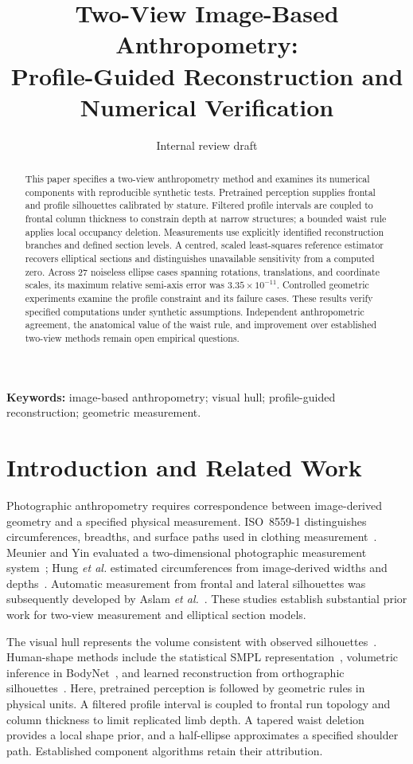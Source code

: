 \documentclass[11pt,a4paper]{article}
\title{Two-View Image-Based Anthropometry:\\
Profile-Guided Reconstruction and Numerical Verification}
\author{Internal review draft}
\date{}
\begin{document}
\maketitle

\begin{abstract}
This paper specifies a two-view anthropometry method and examines its numerical components with reproducible synthetic tests. Pretrained perception supplies frontal and profile silhouettes calibrated by stature. Filtered profile intervals are coupled to frontal column thickness to constrain depth at narrow structures; a bounded waist rule applies local occupancy deletion. Measurements use explicitly identified reconstruction branches and defined section levels. A centred, scaled least-squares reference estimator recovers elliptical sections and distinguishes unavailable sensitivity from a computed zero. Across 27 noiseless ellipse cases spanning rotations, translations, and coordinate scales, its maximum relative semi-axis error was $3.35\times10^{-11}$. Controlled geometric experiments examine the profile constraint and its failure cases. These results verify specified computations under synthetic assumptions. Independent anthropometric agreement, the anatomical value of the waist rule, and improvement over established two-view methods remain open empirical questions.
\end{abstract}
\noindent\textbf{Keywords:} image-based anthropometry; visual hull; profile-guided reconstruction; geometric measurement.

\section{Introduction and Related Work}
Photographic anthropometry requires correspondence between image-derived geometry and a specified physical measurement. ISO~8559-1 distinguishes circumferences, breadths, and surface paths used in clothing measurement~\cite{iso8559}. Meunier and Yin evaluated a two-dimensional photographic measurement system~\cite{meunier2000}; Hung \emph{et al.} estimated circumferences from image-derived widths and depths~\cite{hung2004}. Automatic measurement from frontal and lateral silhouettes was subsequently developed by Aslam \emph{et al.}~\cite{aslam2017}. These studies establish substantial prior work for two-view measurement and elliptical section models.

The visual hull represents the volume consistent with observed silhouettes~\cite{laurentini1994visual}. Human-shape methods include the statistical SMPL representation~\cite{loper2015smpl}, volumetric inference in BodyNet~\cite{varol2018bodynet}, and learned reconstruction from orthographic silhouettes~\cite{ji2019}. Here, pretrained perception is followed by geometric rules in physical units. A filtered profile interval is coupled to frontal run topology and column thickness to limit replicated limb depth. A tapered waist deletion provides a local shape prior, and a half-ellipse approximates a specified shoulder path. Established component algorithms retain their attribution.
\end{document}
